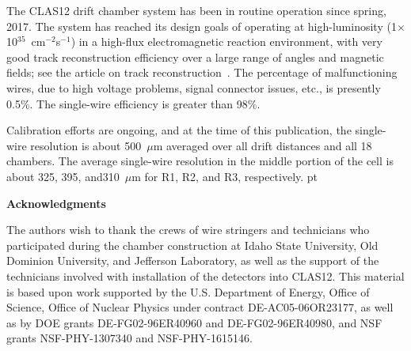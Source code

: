 The CLAS12 drift chamber system has been in routine operation since spring, 2017. 
The system has reached its design goals of operating at high-luminosity
(1$\times$10$^{35}$~cm$^{-2}$s$^{-1}$) in a high-flux electromagnetic reaction
environment, with very good track reconstruction efficiency over a large range of angles and 
magnetic fields; see the article on track reconstruction~\cite{recon-nim}.  
The percentage of malfunctioning wires, due to high voltage problems, signal
connector issues, etc., is presently 0.5\%.
The single-wire efficiency is greater than 98\%.

Calibration efforts are ongoing, and at the time of this publication, the
single-wire resolution is about 500~$\mu$m averaged over all drift distances and
all 18 chambers.  The average single-wire resolution in the middle 
portion of the cell is about 325, 395, and310~$\mu$m for R1, R2, and R3, respectively.
 pt

{\large{\bf Acknowledgments}}

\vskip 10pt

The authors wish to thank the crews of wire stringers and technicians who 
participated during the chamber construction at Idaho State University,
Old Dominion University, and Jefferson Laboratory, as well as the support of 
the technicians involved with installation of the detectors into CLAS12. 
This material is based upon work supported by the U.S. Department of Energy,
Office of Science, Office of Nuclear Physics under contract DE-AC05-06OR23177,
as well as by DOE grants DE-FG02-96ER40960 and DE-FG02-96ER40980, and NSF grants
NSF-PHY-1307340 and NSF-PHY-1615146.




